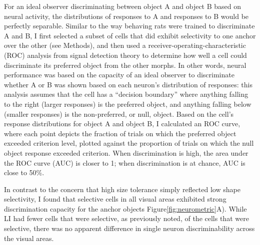 For an ideal observer discriminating between object A and object B based on neural activity, the distributions of responses to A and responses to B would be perfectly separable. Similar to the way behaving rats were trained to discriminate A and B, I first selected a subset of cells that did exhibit selectivity to one anchor over the other (see Methods), and then used a receiver-operating-characteristic (ROC) analysis from signal detection theory to determine how well a cell could discriminate its preferred object from the other morphs\cite{Green1966, Britten1992, Busse2011}. In other words, neural performance was based on the capacity of an ideal observer to discriminate whether A or B was shown based on each neuron's distribution of responses:  this analysis assumes that the cell has a ``decision boundary'' where anything falling to the right (larger responses) is the preferred object, and anything falling below (smaller responses) is the non-preferred, or null, object. Based on the cell's response distributions for object A and object B, I calculated an ROC curve, where each point depicts the fraction of trials on which the preferred object exceeded criterion level, plotted against the proportion of trials on which the null object response exceeded criterion. When discrimination is high, the area under the ROC curve (AUC) is closer to 1; when discrimination is at chance, AUC is close to 50\%. 

In contrast to the concern that high size tolerance simply reflected low shape selectivity, I found that selective cells in all visual areas exhibited strong discrimination capacity for the anchor objects Figure\ref{fig:neurometric}A). While LI had fewer cells that were selective, as previously noted, of the cells that were selective, there was no apparent difference in single neuron discriminability across the visual areas. 

